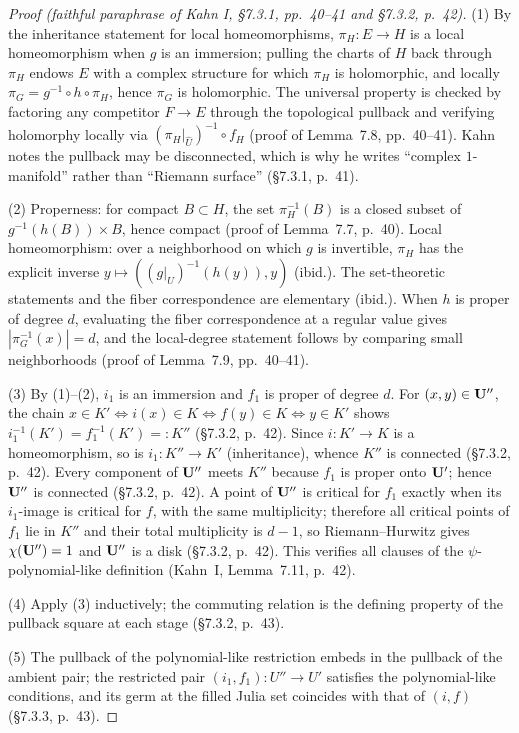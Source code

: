 \documentclass[11pt,reqno]{amsart}
\theoremstyle{definition}
\theoremstyle{remark}
\begin{document}
\begin{proof}[Proof (faithful paraphrase of Kahn I, \S7.3.1, pp.~40--41 and \S7.3.2, p.~42)]
(1) By the inheritance statement for local homeomorphisms,
\(\pi_H\colon E\to H\) is a local homeomorphism when \(g\) is an
immersion; pulling the charts of \(H\) back through \(\pi_H\) endows
\(E\) with a complex structure for which \(\pi_H\) is holomorphic, and
locally \(\pi_G=g^{-1}\circ h\circ\pi_H\), hence \(\pi_G\) is
holomorphic.  The universal property is checked by factoring any
competitor \(F\to E\) through the topological pullback and verifying
holomorphy locally via \((\pi_H|_{\widehat U})^{-1}\circ f_H\)
(proof of Lemma~7.8, pp.~40--41).  Kahn notes the pullback may be disconnected, which is
why he writes ``complex \(1\)-manifold'' rather than ``Riemann
surface'' (\S7.3.1, p.~41).

(2) Properness: for compact \(B\subset H\), the set \(\pi_H^{-1}(B)\)
is a closed subset of \(g^{-1}(h(B))\times B\), hence compact
(proof of Lemma~7.7, p.~40).  Local homeomorphism: over a neighborhood on which
\(g\) is invertible, \(\pi_H\) has the explicit inverse
\(y\mapsto((g|_U)^{-1}(h(y)),y)\) (ibid.).  The set-theoretic
statements and the fiber correspondence are elementary
(ibid.).  When \(h\) is proper of degree \(d\), evaluating the
fiber correspondence at a regular value gives
\(|\pi_G^{-1}(x)|=d\), and the local-degree statement follows by
comparing small neighborhoods (proof of Lemma~7.9, pp.~40--41).

(3) By (1)--(2), \(i_1\) is an immersion and \(f_1\) is proper of
degree \(d\).  For \((x,y)\in\mathbf{U}''\), the chain
\(x\in K'\iff i(x)\in K\iff f(y)\in K\iff y\in K'\) shows
\(i_1^{-1}(K')=f_1^{-1}(K')=:K''\) (\S7.3.2, p.~42).  Since
\(i\colon K'\to K\) is a homeomorphism, so is
\(i_1\colon K''\to K'\) (inheritance), whence \(K''\) is connected
(\S7.3.2, p.~42).  Every component of \(\mathbf{U}''\) meets \(K''\) because
\(f_1\) is proper onto \(\mathbf{U}'\); hence \(\mathbf{U}''\) is connected
(\S7.3.2, p.~42).  A point of \(\mathbf{U}''\) is critical for \(f_1\) exactly
when its \(i_1\)-image is critical for \(f\), with the same
multiplicity; therefore all critical points of \(f_1\) lie in \(K''\)
and their total multiplicity is \(d-1\), so Riemann--Hurwitz gives
\(\chi(\mathbf{U}'')=1\) and \(\mathbf{U}''\) is a disk (\S7.3.2, p.~42).  This
verifies all clauses of the \(\psi\)-polynomial-like definition
(Kahn~I, Lemma~7.11, p.~42).

(4) Apply (3) inductively; the commuting relation is the defining
property of the pullback square at each stage (\S7.3.2, p.~43).

(5) The pullback of the polynomial-like restriction embeds in the
pullback of the ambient pair; the restricted pair
\((i_1,f_1)\colon U''\to U'\) satisfies the polynomial-like
conditions, and its germ at the filled Julia set coincides with that
of \((i,f)\) (\S7.3.3, p.~43).
\end{proof}
\end{document}
